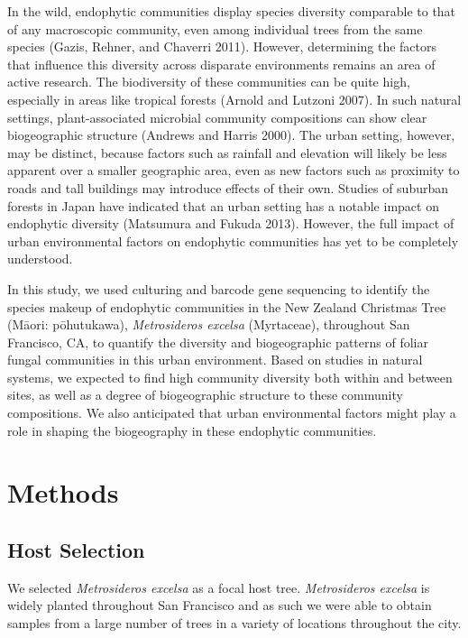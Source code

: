 \documentclass[fleqn,10pt,lineno]{wlpeerj} %
\begin{document}
In the wild, endophytic communities display species diversity comparable to that of any macroscopic community, even among individual trees from the same species (Gazis, Rehner, and Chaverri 2011). However, determining the factors that influence this diversity across disparate environments remains an area of active research. The biodiversity of these communities can be quite high, especially in areas like tropical forests (Arnold and Lutzoni 2007). In such natural settings, plant-associated microbial community compositions can show clear biogeographic structure (Andrews and Harris 2000). The urban setting, however, may be distinct, because factors such as rainfall and elevation will likely be less apparent over a smaller geographic area, even as new factors such as proximity to roads and tall buildings may introduce effects of their own. Studies of suburban forests in Japan have indicated that an urban setting has a notable impact on endophytic diversity (Matsumura and Fukuda 2013). However, the full impact of urban environmental factors on endophytic communities has yet to be completely understood.

In this study, we used culturing and barcode gene sequencing to identify the species makeup of endophytic communities in the New Zealand Christmas Tree (Māori: pōhutukawa), \emph{Metrosideros excelsa} (Myrtaceae), throughout San Francisco, CA, to quantify the diversity and biogeographic patterns of foliar fungal communities in this urban environment. Based on studies in natural systems, we expected to find high community diversity both within and between sites, as well as a degree of biogeographic structure to these community compositions. We also anticipated that urban environmental factors might play a role in shaping the biogeography in these endophytic communities.

\hypertarget{methods}{%
\section*{Methods}\label{methods}}

\hypertarget{host-selection}{%
\subsection*{Host Selection}\label{host-selection}}

We selected \emph{Metrosideros excelsa} as a focal host tree. \emph{Metrosideros excelsa} is widely planted throughout San Francisco and as such we were able to obtain samples from a large number of trees in a variety of locations throughout the city.
\end{document}
